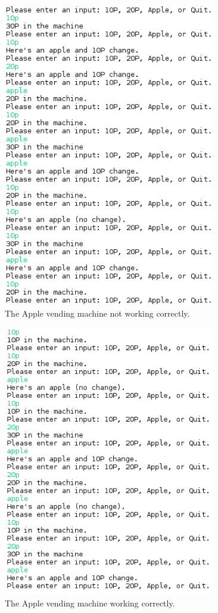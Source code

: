 \documentclass[12pt]{article}
\begin{document}
\begin{figure}
\centering
\includegraphics[width=350]{notworkingfsm.png}
\caption{The Apple vending machine not working correctly.}
\end{figure}

\begin{figure}
\centering
\includegraphics[width=350]{workingfsm.png}
\caption{The Apple vending machine working correctly.}
\end{figure}
\end{document}
